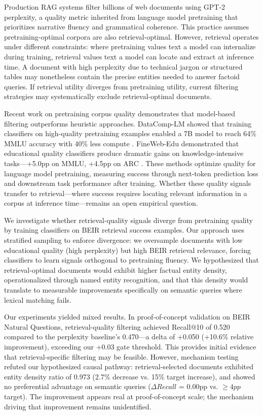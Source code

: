 
Production RAG systems filter billions of web documents using GPT-2 perplexity, a quality metric inherited from language model pretraining that prioritizes narrative fluency and grammatical coherence. This practice assumes pretraining-optimal corpora are also retrieval-optimal. However, retrieval operates under different constraints: where pretraining values text a model can internalize during training, retrieval values text a model can locate and extract at inference time. A document with high perplexity due to technical jargon or structured tables may nonetheless contain the precise entities needed to answer factoid queries. If retrieval utility diverges from pretraining utility, current filtering strategies may systematically exclude retrieval-optimal documents.

Recent work on pretraining corpus quality demonstrates that model-based filtering outperforms heuristic approaches. DataComp-LM showed that training classifiers on high-quality pretraining examples enabled a 7B model to reach 64\% MMLU accuracy with 40\% less compute \citep{Li2024}. FineWeb-Edu demonstrated that educational quality classifiers produce dramatic gains on knowledge-intensive tasks---+5.0pp on MMLU, +4.5pp on ARC \citep{Penedo2024}. These methods optimize quality for language model pretraining, measuring success through next-token prediction loss and downstream task performance after training. Whether these quality signals transfer to retrieval---where success requires locating relevant information in a corpus at inference time---remains an open empirical question.

We investigate whether retrieval-quality signals diverge from pretraining quality by training classifiers on BEIR retrieval success examples. Our approach uses stratified sampling to enforce divergence: we oversample documents with low educational quality (high perplexity) but high BEIR retrieval relevance, forcing classifiers to learn signals orthogonal to pretraining fluency. We hypothesized that retrieval-optimal documents would exhibit higher factual entity density, operationalized through named entity recognition, and that this density would translate to measurable improvements specifically on semantic queries where lexical matching fails.

Our experiments yielded mixed results. In proof-of-concept validation on BEIR Natural Questions, retrieval-quality filtering achieved Recall@10 of 0.520 compared to the perplexity baseline's 0.470---a delta of +0.050 (+10.6\% relative improvement), exceeding our +0.03 gate threshold. This provides initial evidence that retrieval-specific filtering may be feasible. However, mechanism testing refuted our hypothesized causal pathway: retrieval-selected documents exhibited entity density ratio of 0.973 (2.7\% decrease vs. 15\% target increase), and showed no preferential advantage on semantic queries ($\Delta Recall$ = 0.00pp vs. $\geq 4pp$ target). The improvement appears real at proof-of-concept scale; the mechanism driving that improvement remains unidentified.

